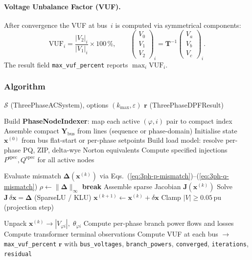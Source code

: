 \paragraph{Voltage Unbalance Factor (VUF).}
After convergence the VUF at bus~$i$ is computed via symmetrical
components:
\[
  \mathrm{VUF}_i = \frac{|V_2|_i}{|V_1|_i} \times 100\,\%,
  \qquad
  \begin{pmatrix}V_0\\V_1\\V_2\end{pmatrix}_{\!i}
  = \mathbf{T}^{-1}
  \begin{pmatrix}V_a\\V_b\\V_c\end{pmatrix}_{\!i}.
\]
The result field \texttt{max\_vuf\_percent} reports
$\max_i \mathrm{VUF}_i$.

\subsubsection{Algorithm}
\label{sec:3ph-nr-algo}

\begin{algorithm}[H]
\caption{Three-Phase Newton-Raphson Power Flow (\texttt{solve\_three\_phase\_nr})}
\label{alg:3ph-nr}
\begin{algorithmic}[1]
\Require $\mathcal{S}$ (ThreePhaseACSystem), options $(k_{\max}, \varepsilon)$
\Ensure  $\mathbf{r}$ (ThreePhaseDPFResult)

\State Build \textbf{PhaseNodeIndexer}: map each active $(\varphi, i)$ pair to compact index
\State Assemble compact $\mathbf{Y}_{\text{bus}}$ from lines (sequence or phase-domain)
\State Initialise state $\mathbf{x}^{(0)}$ from bus flat-start or per-phase setpoints
\State Build load model: resolve per-phase PQ, ZIP, delta-wye Norton equivalents
\State Compute specified injections $P^{\text{spec}}, Q^{\text{spec}}$ for all active nodes

  \State Evaluate mismatch $\boldsymbol{\Delta}(\mathbf{x}^{(k)})$ via
         Eqs.~(\ref{eq:3ph-p-mismatch})--(\ref{eq:3ph-q-mismatch})
  \State $\rho \leftarrow \|\boldsymbol{\Delta}\|_\infty$ 
  \If{$\rho < \varepsilon$}
    \State \textbf{break}
  \EndIf
  \State Assemble sparse Jacobian $\mathbf{J}(\mathbf{x}^{(k)})$
  \State Solve $\mathbf{J}\,\delta\mathbf{x} = \boldsymbol{\Delta}$
         \hfill (SparseLU / KLU)
  \State $\mathbf{x}^{(k+1)} \leftarrow \mathbf{x}^{(k)} + \delta\mathbf{x}$
  \State Clamp $|V| \ge 0.05$\,pu (projection step)
\EndFor

\State Unpack $\mathbf{x}^{(k)} \to |V_{\varphi i}|,\; \theta_{\varphi i}$
\State Compute per-phase branch power flows and losses
\State Compute transformer terminal observations
\State Compute VUF at each bus $\to$ \texttt{max\_vuf\_percent}
\State \Return $\mathbf{r}$ with \texttt{bus\_voltages}, \texttt{branch\_powers},
               \texttt{converged}, \texttt{iterations}, \texttt{residual}
\end{algorithmic}
\end{algorithm}

